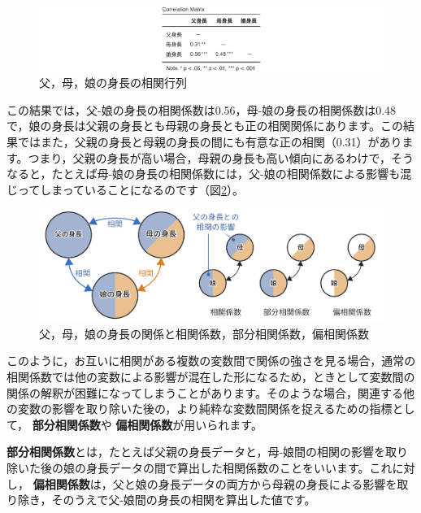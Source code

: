 \documentclass[
  12pt,
  a5jpaper,
  lualatex, ja=standard]{bxjsbook}
\renewcommand{\emph}[1]{\textbf{\color{emph} #1}}
\begin{document}
\begin{figure}[!ht]

{\centering \includegraphics[width=1\linewidth]{images/regression/paper-cormat} 

}

\caption{父，母，娘の身長の相関行列}\label{fig:regression-partial-cormat}
\end{figure}

この結果では，父-娘の身長の相関係数は0.56，母-娘の身長の相関係数は0.48で，娘の身長は父親の身長とも母親の身長とも正の相関関係にあります。この結果ではまた，父親の身長と母親の身長の間にも有意な正の相関（0.31）があります。つまり，父親の身長が高い場合，母親の身長も高い傾向にあるわけで，そうなると，たとえば母-娘の身長の相関係数には，父-娘の相関係数による影響も混じってしまっていることになるのです（図\ref{fig:regression-partial-basic}）。

\begin{figure}[!ht]

{\centering \includegraphics[width=1\linewidth]{images/regression/partial-basic} 

}

\caption{父，母，娘の身長の関係と相関係数，部分相関係数，偏相関係数}\label{fig:regression-partial-basic}
\end{figure}

このように，お互いに相関がある複数の変数間で関係の強さを見る場合，通常の相関係数では他の変数による影響が混在した形になるため，ときとして変数間の関係の解釈が困難になってしまうことがあります。そのような場合，関連する他の変数の影響を取り除いた後の，より純粋な変数間関係を捉えるための指標として，\emph{部分相関係数}や\emph{偏相関係数}が用いられます。

\emph{部分相関係数}とは，たとえば父親の身長データと，母-娘間の相関の影響を取り除いた後の娘の身長データの間で算出した相関係数のことをいいます。これに対し，\emph{偏相関係数}は，父と娘の身長データの両方から母親の身長による影響を取り除き，そのうえで父-娘間の身長の相関を算出した値です。
\end{document}
